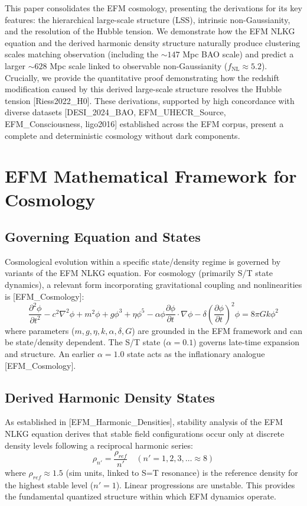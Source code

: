 \documentclass[11pt]{article}
\begin{document}
This paper consolidates the EFM cosmology, presenting the derivations for its key features: the hierarchical large-scale structure (LSS), intrinsic non-Gaussianity, and the resolution of the Hubble tension. We demonstrate how the EFM NLKG equation and the derived harmonic density structure naturally produce clustering scales matching observation (including the \(\sim 147\) Mpc BAO scale) and predict a larger \(\sim 628\) Mpc scale linked to observable non-Gaussianity (\(f_{\text{NL}} \approx 5.2\)). Crucially, we provide the quantitative proof demonstrating how the redshift modification caused by this derived large-scale structure resolves the Hubble tension [Riess2022\_H0]. These derivations, supported by high concordance with diverse datasets [DESI\_2024\_BAO, EFM\_UHECR\_Source, EFM\_Consciousness, ligo2016] established across the EFM corpus, present a complete and deterministic cosmology without dark components.

\section{EFM Mathematical Framework for Cosmology}
\subsection{Governing Equation and States}
Cosmological evolution within a specific state/density regime is governed by variants of the EFM NLKG equation. For cosmology (primarily S/T state dynamics), a relevant form incorporating gravitational coupling and nonlinearities is [EFM\_Cosmology]:
\begin{equation}
\frac{\partial^2 \phi}{\partial t^2} - c^2 \nabla^2 \phi + m^2 \phi + g \phi^3 + \eta \phi^5 - \alpha \phi \frac{\partial \phi}{\partial t} \cdot \nabla \phi - \delta \left(\frac{\partial \phi}{\partial t}\right)^2 \phi = 8\pi G k \phi^2
\label{eq:efm_cosmo_kge}
\end{equation}
where parameters (\(m, g, \eta, k, \alpha, \delta, G\)) are grounded in the EFM framework and can be state/density dependent. The S/T state (\(\alpha=0.1\)) governs late-time expansion and structure. An earlier \(\alpha=1.0\) state acts as the inflationary analogue [EFM\_Cosmology].

\subsection{Derived Harmonic Density States}
As established in [EFM\_Harmonic\_Densities], stability analysis of the EFM NLKG equation derives that stable field configurations occur only at discrete density levels following a reciprocal harmonic series:
\begin{equation}
\rho_{n'} = \frac{\rho_{ref}}{n'} \quad (n'=1, 2, 3, \dots \approx 8)
\end{equation}
where \(\rho_{ref} \approx 1.5\) (sim units, linked to S=T resonance) is the reference density for the highest stable level (\(n'=1\)). Linear progressions are unstable. This provides the fundamental quantized structure within which EFM dynamics operate.
\end{document}
